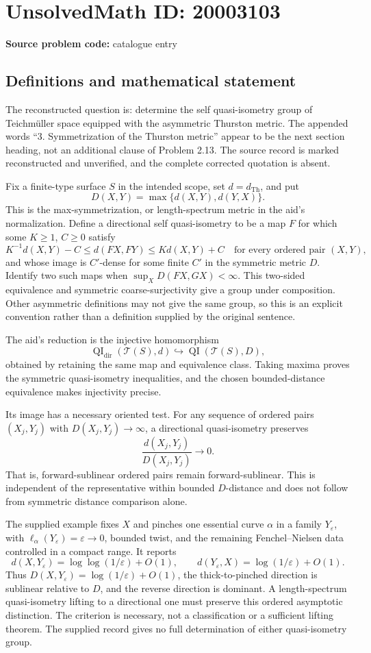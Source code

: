 \documentclass[11pt]{article}
\newcommand{\eps}{\varepsilon}
\begin{document}
\section*{UnsolvedMath ID: 20003103}
\textbf{Source problem code:} catalogue entry
\subsection{Definitions and mathematical statement}
The reconstructed question is: determine the self quasi-isometry group of Teichm\"uller space equipped with the asymmetric Thurston metric. The appended words ``3. Symmetrization of the Thurston metric'' appear to be the next section heading, not an additional clause of Problem 2.13. The source record is marked reconstructed and unverified, and the complete corrected quotation is absent.

Fix a finite-type surface $S$ in the intended scope, set $d=d_{\mathrm{Th}}$, and put
\[
 D(X,Y)=\max\{d(X,Y),d(Y,X)\}.
\]
This is the max-symmetrization, or length-spectrum metric in the aid's normalization. Define a directional self quasi-isometry to be a map $F$ for which some $K\geq1$, $C\geq0$ satisfy
\[
 K^{-1}d(X,Y)-C\leq d(FX,FY)\leq Kd(X,Y)+C
 \quad\text{for every ordered pair }(X,Y),
\]
and whose image is $C'$-dense for some finite $C'$ in the symmetric metric $D$. Identify two such maps when $\sup_XD(FX,GX)<\infty$. This two-sided equivalence and symmetric coarse-surjectivity give a group under composition. Other asymmetric definitions may not give the same group, so this is an explicit convention rather than a definition supplied by the original sentence.

The aid's reduction is the injective homomorphism
\[
 \operatorname{QI}_{\mathrm{dir}}(\mathcal T(S),d)
       \hookrightarrow\operatorname{QI}(\mathcal T(S),D),
\]
obtained by retaining the same map and equivalence class. Taking maxima proves the symmetric quasi-isometry inequalities, and the chosen bounded-distance equivalence makes injectivity precise.

Its image has a necessary oriented test. For any sequence of ordered pairs $(X_j,Y_j)$ with $D(X_j,Y_j)\to\infty$, a directional quasi-isometry preserves
\[
 \frac{d(X_j,Y_j)}{D(X_j,Y_j)}\longrightarrow0.
\]
That is, forward-sublinear ordered pairs remain forward-sublinear. This is independent of the representative within bounded $D$-distance and does not follow from symmetric distance comparison alone.

The supplied example fixes $X$ and pinches one essential curve $\alpha$ in a family $Y_\eps$, with $\ell_\alpha(Y_\eps)=\eps\to0$, bounded twist, and the remaining Fenchel--Nielsen data controlled in a compact range. It reports
\[
 d(X,Y_\eps)=\log\log(1/\eps)+O(1),\qquad
 d(Y_\eps,X)=\log(1/\eps)+O(1).
\]
Thus $D(X,Y_\eps)=\log(1/\eps)+O(1)$, the thick-to-pinched direction is sublinear relative to $D$, and the reverse direction is dominant. A length-spectrum quasi-isometry lifting to a directional one must preserve this ordered asymptotic distinction. The criterion is necessary, not a classification or a sufficient lifting theorem. The supplied record gives no full determination of either quasi-isometry group.
\end{document}
